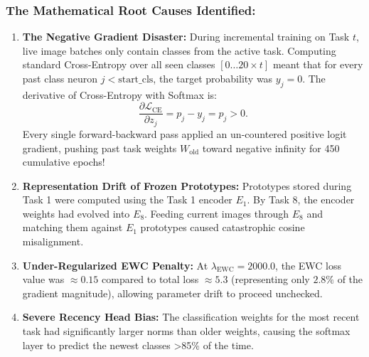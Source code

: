 \documentclass[11pt,a4paper]{article}
\begin{document}
    \subsubsection{The Mathematical Root Causes Identified:}
    \begin{enumerate}[leftmargin=*]
        \item \textbf{The Negative Gradient Disaster:}
        During incremental training on Task $t$, live image batches only contain classes from the active task. Computing standard Cross-Entropy over all seen classes $[0 \dots 20 \times t]$ meant that for every past class neuron $j < \text{start\_cls}$, the target probability was $y_j = 0$.
        The derivative of Cross-Entropy with Softmax is:
        \begin{equation}
            \frac{\partial \mathcal{L}_{\text{CE}}}{\partial z_j} = p_j - y_j = p_j > 0.
        \end{equation}
        Every single forward-backward pass applied an un-countered positive logit gradient, pushing past task weights $W_{\text{old}}$ toward negative infinity for 450 cumulative epochs!
        \item \textbf{Representation Drift of Frozen Prototypes:}
        Prototypes stored during Task 1 were computed using the Task 1 encoder $E_1$. By Task 8, the encoder weights had evolved into $E_8$. Feeding current images through $E_8$ and matching them against $E_1$ prototypes caused catastrophic cosine misalignment.
        \item \textbf{Under-Regularized EWC Penalty:}
        At $\lambda_{\text{EWC}} = 2000.0$, the EWC loss value was $\approx 0.15$ compared to total loss $\approx 5.3$ (representing only $2.8\%$ of the gradient magnitude), allowing parameter drift to proceed unchecked.
        \item \textbf{Severe Recency Head Bias:}
        The classification weights for the most recent task had significantly larger norms than older weights, causing the softmax layer to predict the newest classes >85\% of the time.
    \end{enumerate}
\end{document}
